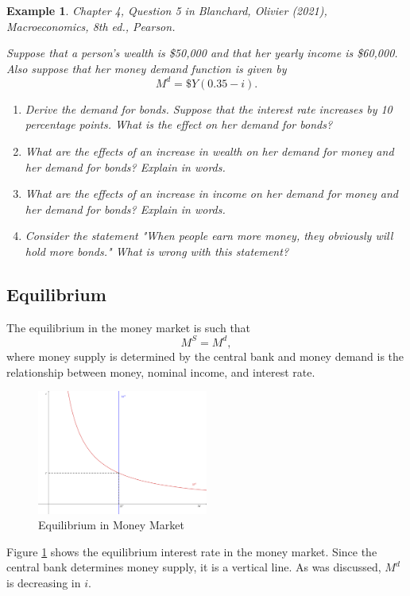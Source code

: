 \documentclass[12pt]{article}
\newtheorem{example}{Example}
\begin{document}
\begin{example}
	Chapter 4, Question 5 in Blanchard, Olivier (2021), \textit{Macroeconomics}, 8th ed., Pearson.

	Suppose that a person's wealth is \$50,000 and that her yearly income is \$60,000. Also suppose that her money demand function is given by
	\[M^d = \$ Y (0.35 - i).\]

	\begin{enumerate}[label=(\alph*)]
		\item Derive the demand for bonds. Suppose that the interest rate increases by 10 percentage points. What is the effect on her demand for bonds?
		\vspace{36pt}
		\item What are the effects of an increase in wealth on her demand for money and her demand for bonds? Explain in words.
		\vspace{36pt}
		\item What are the effects of an increase in income on her demand for money and her demand for bonds? Explain in words.
		\vspace{36pt}
		\item Consider the statement "When people earn more money, they obviously will hold more bonds." What is wrong with this statement?
		\vspace{36pt}
	\end{enumerate}
\end{example}

\subsection*{Equilibrium}
The equilibrium in the money market is such that 
\[M^S = M^d,\]
where money supply is determined by the central bank and money demand is the relationship between money, nominal income, and interest rate. 

\begin{figure}[htp]
    \centering
    \includegraphics[width=0.5\textwidth]{money_eqm_01.png}
    \caption{Equilibrium in Money Market}
    \label{fig:money_eqm_01}
\end{figure}
Figure \ref{fig:money_eqm_01} shows the equilibrium interest rate in the money market. Since the central bank determines money supply, it is a vertical line. As was discussed, $M^d$ is decreasing in $i$.
\end{document}

